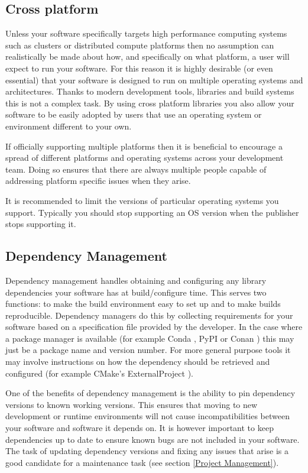 \documentclass[jnr]{iosart2x}
\begin{document}
\subsection{Cross platform}
\label{Cross platform}

Unless your software specifically targets high performance computing systems such as clusters or distributed compute platforms then no assumption can realistically be made about how, and specifically on what platform, a user will expect to run your software.
For this reason it is highly desirable (or even essential) that your software is designed to run on multiple operating systems and architectures.
Thanks to modern development tools, libraries and build systems this is not a complex task.
By using cross platform libraries you also allow your software to be easily adopted by users that use an operating system or environment different to your own.

If officially supporting multiple platforms then it is beneficial to encourage a spread of different platforms and operating systems across your development team.
Doing so ensures that there are always multiple people capable of addressing platform specific issues when they arise.

It is recommended to limit the versions of particular operating systems you support.
Typically you should stop supporting an OS version when the publisher stops supporting it.

\subsection{Dependency Management}
\label{Dependency Management}

Dependency management handles obtaining and configuring any library dependencies your software has at build/configure time.
This serves two functions: to make the build environment easy to set up and to make builds reproducible.
Dependency managers do this by collecting requirements for your software based on a specification file provided by the developer.
In the case where a package manager is available (for example Conda \cite{Conda}, PyPI \cite{PyPI} or Conan \cite{Conan}) this may just be a package name and version number.
For more general purpose tools it may involve instructions on how the dependency should be retrieved and configured (for example CMake's ExternalProject \cite{CMake_ExternalProject}).

One of the benefits of dependency management is the ability to pin dependency versions to known working versions.
This ensures that moving to new development or runtime environments will not cause incompatibilities between your software and software it depends on.
It is however important to keep dependencies up to date to ensure known bugs are not included in your software.
The task of updating dependency versions and fixing any issues that arise is a good candidate for a maintenance task (see section \ref{Project Management}).
\end{document}
